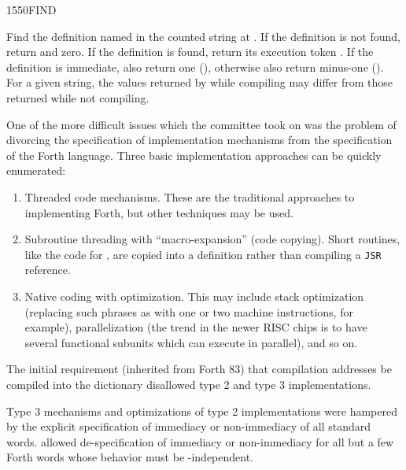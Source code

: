 \vspace*{-1ex}\enlargethispage{8ex}
\begin{worddef}{1550}{FIND}
\item {}

	Find the definition named in the counted string at .
	If the definition is not found, return  and zero.
	If the definition is found, return its execution token .
	If the definition is immediate, also return one (),
	otherwise also return minus-one (). For a given string,
	the values returned by  while compiling may differ
	from those returned while not compiling.


	\begin{rationale} %
		One of the more difficult issues which the committee took on
		was the problem of divorcing the specification of
		implementation mechanisms from the specification of the
		Forth language. Three basic implementation approaches can be
		quickly enumerated:

		\begin{enumerate}
		\item[1)] Threaded code mechanisms.
			These are the traditional approaches to implementing Forth,
			but other techniques may be used.

		\item[2)] Subroutine threading with ``macro-expansion'' (code
			copying). Short routines, like the code for ,
			are copied into a definition rather than compiling a
			\texttt{JSR} reference.

		\item[3)] Native coding with optimization.
			This may include stack optimization (replacing such phrases
			as   \word{+} with one or two machine
			instructions, for example), parallelization (the trend in
			the newer RISC chips is to have several functional subunits
			which can execute in parallel), and so on.
		\end{enumerate}

		The initial requirement (inherited from Forth 83) that
		compilation addresses be compiled into the dictionary
		disallowed type 2 and type 3 implementations.

		Type 3 mechanisms and optimizations of type 2 implementations
		were hampered by the explicit specification of immediacy or
		non-immediacy of all standard words.  allowed
		de-spec\-i\-fi\-ca\-tion of immediacy or non-immediacy for all but a
		few Forth words whose behavior must be -independent.


\end{rationale}
\end{worddef}
